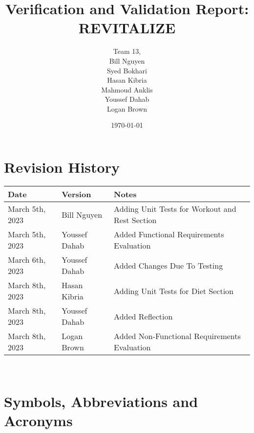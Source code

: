 \documentclass[12pt, titlepage]{article}
\begin{document}
\title{Verification and Validation Report: REVITALIZE} 
\author{Team 13, 
\\ Bill Nguyen
\\ Syed Bokhari
\\ Hasan Kibria
\\ Mahmoud Anklis
\\ Youssef Dahab
\\ Logan Brown}
\date{\today}

\maketitle


\section{Revision History}

\begin{tabularx}{\textwidth}{p{3cm}p{2cm}X}
\toprule {\bf Date} & {\bf Version} & {\bf Notes}\\
\midrule
March 5th, 2023 & Bill Nguyen & Adding Unit Tests for Workout and Rest Section\\
March 5th, 2023 & Youssef Dahab & Added Functional Requirements Evaluation\\
March 6th, 2023 & Youssef Dahab & Added Changes Due To Testing\\
March 8th, 2023 & Hasan Kibria & Adding Unit Tests for Diet Section\\
March 8th, 2023 & Youssef Dahab & Added Reflection\\
March 8th, 2023 & Logan Brown & Added Non-Functional Requirements Evaluation\\
\bottomrule
\end{tabularx}

~\newpage

\section{Symbols, Abbreviations and Acronyms}
\end{document}
